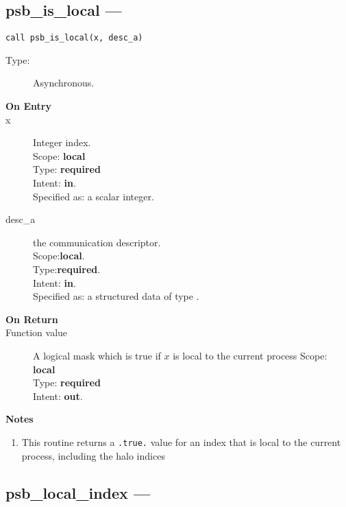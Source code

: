 \clearpage\subsection*{psb\_is\_local  --- }

\begin{verbatim}
call psb_is_local(x, desc_a)
\end{verbatim}

\begin{description}
\item[Type:] Asynchronous.
\item[\bf On Entry]
\item[x] Integer index.\\
Scope: {\bf local} \\
Type: {\bf required}\\
Intent: {\bf in}.\\
Specified as: a scalar integer.\\
\item[desc\_a] the communication descriptor.\\
Scope:{\bf local}.\\
Type:{\bf required}.\\
Intent: {\bf in}.\\
Specified as: a structured data of type \descdata.
\end{description}

\begin{description}
\item[\bf On Return]
\item[Function value] A logical mask which is true if 
  $x$ is  local to the current process
Scope: {\bf local} \\
Type: {\bf required}\\
Intent: {\bf out}.\\
\end{description}


{\par\noindent\large\bfseries Notes}
\begin{enumerate}
\item This routine returns a \verb|.true.| value for an index
  that is local to the current process, including the halo
  indices
\end{enumerate}

\clearpage\subsection*{psb\_local\_index  --- }

